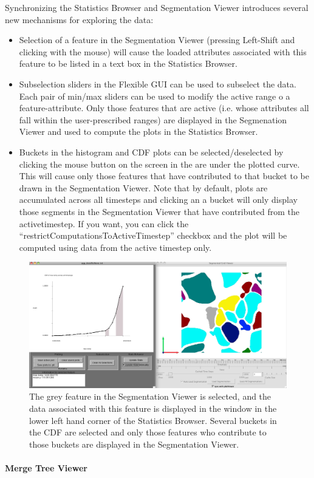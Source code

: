 Synchronizing the Statistics Browser and Segmentation Viewer introduces several new mechanisms for exploring the data:
\begin{itemize}
\item Selection of a feature in the Segmentation Viewer (pressing Left-Shift and clicking with the mouse) will cause the loaded attributes 
associated with this feature to be listed in a text box in the Statistics Browser. 
\item Subselection sliders in the Flexible GUI can be used to subselect the data.  Each pair of min/max sliders can be used to modify the active 
range o a feature-attribute.  Only those features that are active (i.e. whose attributes all fall within the user-prescribed ranges) are
displayed in the Segmenation Viewer and used to compute the plots in the Statistics Browser.
\item Buckets in the histogram and CDF plots can be selected/deselected by clicking the mouse button on the screen in the are under the plotted curve.  
This will cause only those features that have contributed to that bucket to be drawn in the Segmentation Viewer.  Note that by default, plots are 
accumulated across all timesteps and clicking an a bucket will only display those segments in the Segmentation Viewer that have contributed from 
the activetimestep.  If you want, you can click the “restrictComputationsToActiveTimestep” checkbox and the plot will be computed using data from 
the active timestep only.
\end{itemize}

\begin{figure}[h]
  \center
  \includegraphics[width=6in]{jpeg/plotSelection.jpg} 
  \caption{The grey feature in the Segmentation Viewer is selected, and the data associated with this feature is displayed in the window in the 
 lower left hand corner of the Statistics Browser.  Several buckets in the CDF are selected and only those features who contribute to those buckets are displayed
 in the Segmentation Viewer. } 
  \label{fig:statsBrowser}
\end{figure}


\paragraph{Merge Tree Viewer}
